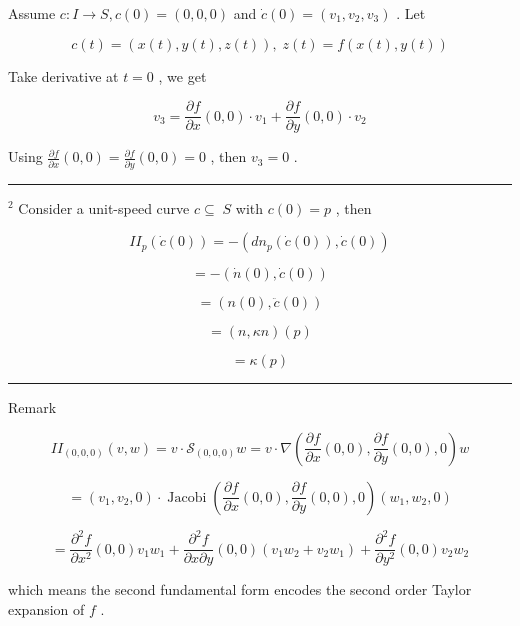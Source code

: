 \documentclass[lang=cn,a4paper,11pt,openany,twoside]{elegantbook}
\newcommand{\HRule}{\begin{center}\rule{0.9\linewidth}{0.2mm}\end{center}}
\begin{document}
Assume \(c : I \rightarrow  S,c\left( 0\right)  = \left( {0,0,0}\right)\) and \(\dot{c}\left( 0\right)  = \left( {{v}_{1},{v}_{2},{v}_{3}}\right)\) . Let

\[
c\left( t\right)  = \left( {x\left( t\right) ,y\left( t\right) ,z\left( t\right) }\right) ,\;z\left( t\right)  = f\left( {x\left( t\right) ,y\left( t\right) }\right)
\]

Take derivative at \(t = 0\) , we get

\[
{v}_{3} = \frac{\partial f}{\partial x}\left( {0,0}\right)  \cdot  {v}_{1} + \frac{\partial f}{\partial y}\left( {0,0}\right)  \cdot  {v}_{2}
\]

Using \(\frac{\partial f}{\partial x}\left( {0,0}\right)  = \frac{\partial f}{\partial y}\left( {0,0}\right)  = 0\) , then \({v}_{3} = 0\) .

\HRule

\({}^{2}\) Consider a unit-speed curve \(c \subseteq \; S\) with \(c\left( 0\right)  = p\) , then

\[
I{I}_{p}\left( {\dot{c}\left( 0\right) }\right)  =  - \left( {d{n}_{p}\left( {\dot{c}\left( 0\right) }\right) ,\dot{c}\left( 0\right) }\right)
\]

\[
=  - \left( {\dot{n}\left( 0\right) ,\dot{c}\left( 0\right) }\right)
\]

\[
= \left( {n\left( 0\right) ,\ddot{c}\left( 0\right) }\right)
\]

\[
= \left( {n,{\kappa n}}\right) \left( p\right)
\]

\[
= \kappa \left( p\right)
\]

\HRule

Remark

\[
I{I}_{\left( 0,0,0\right) }\left( {v,w}\right)  = v \cdot  {\mathcal{S}}_{\left( 0,0,0\right) }w = v \cdot  \nabla \left( {\frac{\partial f}{\partial x}\left( {0,0}\right) ,\frac{\partial f}{\partial y}\left( {0,0}\right) ,0}\right) w
\]

\[
= \left( {{v}_{1},{v}_{2},0}\right)  \cdot  \operatorname{Jacobi}\left( {\frac{\partial f}{\partial x}\left( {0,0}\right) ,\frac{\partial f}{\partial y}\left( {0,0}\right) ,0}\right) \left( {{w}_{1},{w}_{2},0}\right)
\]

\[
= \frac{{\partial }^{2}f}{\partial {x}^{2}}\left( {0,0}\right) {v}_{1}{w}_{1} + \frac{{\partial }^{2}f}{\partial x\partial y}\left( {0,0}\right) \left( {{v}_{1}{w}_{2} + {v}_{2}{w}_{1}}\right)  + \frac{{\partial }^{2}f}{\partial {y}^{2}}\left( {0,0}\right) {v}_{2}{w}_{2}
\]

which means the second fundamental form encodes the second order Taylor expansion of \(f\) .
\end{document}
